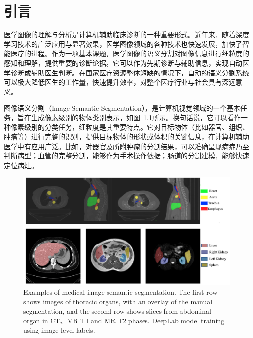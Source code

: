 \chapter{引言}

医学图像的理解与分析是计算机辅助临床诊断的一种重要形式。近年来，随着深度学习技术的广泛应用与显著效果，医学图像领域的各种技术也快速发展，加快了智能医疗的进程。作为一项基本课题，医学图像的语义分割对图像信息进行细粒度的感知和理解，提供重要的诊断论据。它可以作为先期诊断与辅助信息，实现自动医学诊断或辅助医生判断。在国家医疗资源整体短缺的情况下，自动的语义分割系统可以极大降低医生的工作量，快速提升效率，对整个医疗行业与社会具有深远意义。

图像语义分割（Image Semantic Segmentation），是计算机视觉领域的一个基本任务，旨在生成像素级别的物体类别表示\citep{long2015fully,chen2017deeplab,ronneberger2015u,isensee2019automated}，如图~\ref{c1_fig1}所示。换句话说，它可以看作一种像素级别的分类任务，细粒度是其重要特点。它对目标物体（比如器官、组织、肿瘤等）进行完整的识别，提供目标物体的形状或体积的关键信息，在计算机辅助医学中有应用广泛。比如，对器官及所附肿瘤的分割结果，可以准确呈现病症乃至判断病型；血管的完整分割，能够作为手术操作依据；肠道的分割建模，能够快速定位病灶。

    \begin{figure}[tbp]
        \centering 
        \includegraphics[width=1.0\textwidth]{img/c1/intro_1.png}
        {Examples of medical image semantic segmentation. The first row shows images of thoracic organs, with an overlay of the manual segmentation, and the second row shows slices from abdominal organ in CT、MR T1 and MR T2 phases.
        DeepLab model training using image-level labels.}
        \label{c1_fig1}
    \end{figure}


